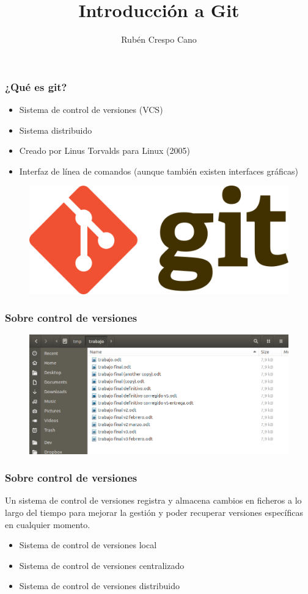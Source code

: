 \documentclass{beamer}
\title[Introducción a Git]{Introducción a Git}
\author{Rubén Crespo Cano}
\institute[]
{
{\color{gray}\textit{@rcrespocano}}
}
\date{}
\begin{document}
\begin{frame}
\titlepage
\end{frame}

\begin{frame}
\frametitle{¿Qué es git?}
\begin{itemize}
\item Sistema de control de versiones (VCS)
\item Sistema distribuido
\item Creado por Linus Torvalds para Linux (2005)
\item Interfaz de línea de comandos (aunque también existen interfaces gráficas)
\end{itemize}
\vskip 0.25cm
\begin{figure}
\includegraphics[width=0.50\linewidth]{img/gitlogo.png}
\end{figure}
\end{frame}

\begin{frame}
\frametitle{Sobre control de versiones}
\begin{figure}
\includegraphics[width=0.90\linewidth]{img/document-versions.png}
\end{figure}
\end{frame}

\begin{frame}
\frametitle{Sobre control de versiones}
Un sistema de control de versiones registra y almacena cambios en ficheros a lo largo del tiempo para mejorar la gestión y poder recuperar versiones específicas en cualquier momento.
\vskip 0.50cm
\begin{itemize}
\item Sistema de control de versiones local
\item Sistema de control de versiones centralizado
\item Sistema de control de versiones distribuido
\end{itemize}
\end{frame}
\end{document}
